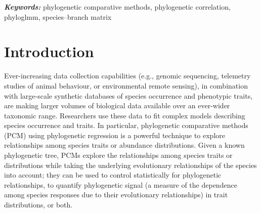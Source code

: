 \documentclass[12pt]{article}
\providecommand{\keywords}[1]{\textbf{\textit{Keywords:}} #1}
\begin{document}
\keywords{phylogenetic comparative methods, phylogenetic correlation, phyloglmm, species--branch matrix}


\doublespacing

\section*{Introduction}

Ever-increasing data collection capabilities (e.g., genomic sequencing, telemetry studies of animal behaviour, or environmental remote sensing), in combination with large-scale synthetic databases of species occurrence and phenotypic traits, are making larger volumes of biological data available over an ever-wider taxonomic range.
Researchers use these data to fit complex models describing species occurrence and traits.
In particular, phylogenetic comparative methods (PCM) using phylogenetic regression \citep{hansen2012interpreting} is a powerful technique to explore relationships among species traits or abundance distributions.
Given a known phylogenetic tree, PCMs explore the relationships among species traits or distributions while taking the underlying evolutionary relationships of the species into account; they can be used to control statistically for phylogenetic relationships, to quantify phylogenetic signal (a measure of the dependence among species responses due to their evolutionary relationships) in trait distributions, or both.
\end{document}
